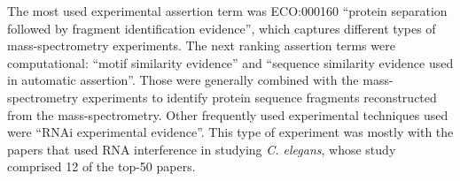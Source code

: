 \documentclass[12pt]{article}
\begin{document}
The most used experimental assertion term was ECO:000160 ``protein separation followed by fragment
identification evidence'', which captures different types of mass-spectrometry experiments.  The
next ranking assertion terms were computational: ``motif similarity evidence'' and ``sequence
similarity evidence used in automatic assertion''.  Those were generally combined with the
mass-spectrometry experiments to identify protein sequence fragments reconstructed from the
mass-spectrometry. Other frequently used experimental techniques used were ``RNAi experimental
evidence''. This type of experiment was mostly with the papers that used RNA interference in
studying \textit{C. elegans}, whose study comprised 12 of the top-50 papers.

% 
% 
% 
% 
\end{document}
